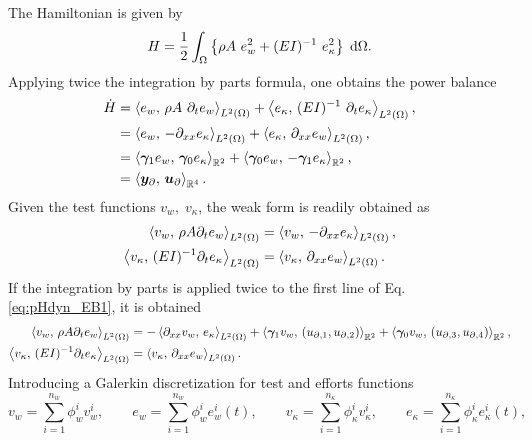 The Hamiltonian is given by 
\begin{equation}
H = \energy{\rho A \ e_w^2 + (EI)^{-1}\ e_\kappa^2}.
\end{equation}
Applying twice the integration by parts formula, one obtains the power balance
\begin{equation}
\begin{aligned}
\dot{H} &= \inner[L^2(\Omega)]{e_w}{\rho A \ \partial_{t} e_w} + \inner[L^2(\Omega)]{e_\kappa}{(E I)^{-1} \ \partial_{t} e_\kappa}, \\
&=\inner[L^2(\Omega)]{e_w}{-\partial_{xx} e_\kappa} + \inner[L^2(\Omega)]{e_\kappa}{\partial_{xx} e_w}, \\
&=\inner[\mathbb{R}^2]{\bm\gamma_{1} e_w}{\bm\gamma_{0} e_\kappa} + \inner[\mathbb{R}^2]{\bm\gamma_{0} e_w}{-\bm\gamma_{1} e_\kappa}, \\
&= \inner[\mathbb{R}^4]{\bm{y}_\partial}{\bm{u}_\partial}.
\end{aligned}
\end{equation}
Given the test functions $v_w, \; v_\kappa$, the weak form is readily obtained as 
\begin{equation}
\begin{aligned}
\inner[L^2(\Omega)]{v_w}{\rho A \partial_t e_w} &= \inner[L^2(\Omega)]{v_w}{-\partial_{xx} e_\kappa}, \\
\inner[L^2(\Omega)]{v_\kappa}{(EI)^{-1} \partial_t e_\kappa} &= \inner[L^2(\Omega)]{v_\kappa}{\partial_{xx} e_w}. \\
\end{aligned}
\end{equation}
If the integration by parts is applied twice to the first line of Eq. \eqref{eq:pHdyn_EB1}, it is obtained
\begin{equation}
\begin{aligned}
\inner[L^2(\Omega)]{v_w}{\rho A \partial_t e_w} &= -\inner[L^2(\Omega)]{\partial_{xx} v_w}{e_\kappa} + \inner[\mathbb{R}^2]{\bm\gamma_1 v_w}{({u}_{\partial, 1}, {u}_{\partial, 2})} + \inner[\mathbb{R}^2]{\bm\gamma_0 v_w}{({u}_{\partial, 3}, {u}_{\partial, 4})}, \\
\inner[L^2(\Omega)]{v_\kappa}{(EI)^{-1} \partial_t e_\kappa} &= \inner[L^2(\Omega)]{v_\kappa}{\partial_{xx} e_w}. \\
\end{aligned}
\end{equation}
Introducing a Galerkin discretization for test and efforts functions
\begin{equation}
v_w = \sum_{i = 1}^{n_w} \phi_w^i v_w^i, \qquad e_w = \sum_{i = 1}^{n_w} \phi_w^i e_w^i(t),
\qquad v_\kappa = \sum_{i = 1}^{n_\kappa} \phi_\kappa^i v_\kappa^i, \qquad e_\kappa = \sum_{i = 1}^{n_\kappa} \phi_\kappa^i e_\kappa^i(t),
\end{equation} 
